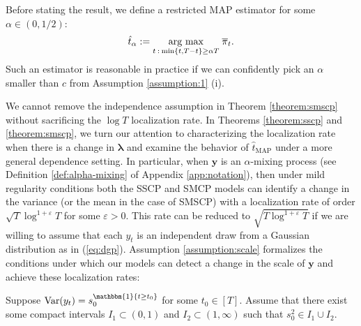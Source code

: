 Before stating the result, we define a restricted MAP estimator for some $\alpha \in (0,1/2)$:
\begin{align}
    \label{eq:restricted-map}
        \hat{t}_{\alpha} := \underset{t \::\: \min\{t, T-t\} \geq \alpha T}{\text{arg max}} \; \overline{\pi}_t.
\end{align}
Such an estimator is reasonable in practice if we can confidently pick an $\alpha$ smaller than $c$ from Assumption \ref{assumption:1} (i). 


We cannot remove the independence assumption in Theorem \ref{theorem:smscp} without sacrificing the $\log T$ localization rate. In Theorems \ref{theorem:sscp} and \ref{theorem:smscp}, we turn our attention to characterizing the localization rate when there is a change in $\boldsymbol{\lambda}$ and examine the behavior of $\hat{t}_{\text{MAP}}$ under a more general dependence setting. In particular, when $\mathbf{y}$ is an $\alpha$-mixing process (see Definition \ref{def:alpha-mixing} of Appendix \ref{app:notation}), then under mild regularity conditions both the SSCP and SMCP models can identify a change in the variance (or the mean in the case of SMSCP) with a localization rate of order $\sqrt{T}\log^{1+\varepsilon} T$ for some $\varepsilon >0 $. This rate can be reduced to $\sqrt{T\log^{1+\varepsilon} T}$ if we are willing to assume that each $y_t$ is an independent draw from a Gaussian distribution as in (\ref{eq:dgp}). Assumption \ref{assumption:scale} formalizes the conditions under which our models can detect a change in the scale of $\mathbf{y}$ and achieve these localization rates:

\begin{assumption}\label{assumption:scale}
   Suppose $\Var(y_t) = s_0^{\mathbbm{1}\{t\geq t_0\}}$ for some $t_0 \in [T]$. Assume that there exist some compact intervals $I_1 \subset (0, 1)$ and $I_2 \subset (1, \infty)$ such that $s_0^2 \in I_1 \cup I_2$. 
\end{assumption}


